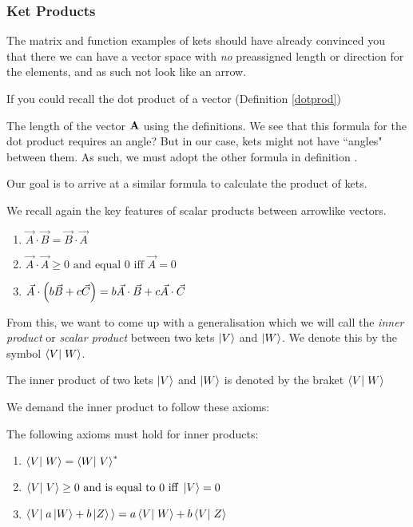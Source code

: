 \subsubsection{Ket Products}
The matrix and function examples of kets should have already convinced you that there we can have a vector space with \emph{no} preassigned length or direction for the elements, and as such not look like an arrow.

If you could recall the dot product of a vector (Definition \ref{dotprod})


The length of the vector $\mathbf{A}$ using the definitions. We see that this formula for the dot product requires an angle? But in our case, kets might not have ``angles" between them. As such, we must adopt the other formula in definition .


Our goal is to arrive at a similar formula to calculate the product of kets.

We recall again the key features of scalar products between arrowlike vectors.
\begin{enumerate}
\item $\vec{A} \cdot \vec{B} = \vec{B} \cdot \vec{A}$
\item $\vec{A} \cdot \vec{A} \geq 0 \text{ and equal } 0 \text{ iff } \vec{A} = 0$
\item $\vec{A} \cdot\left(b\vec{B} + c\vec{C} \right) = b\vec{A}\cdot\vec{B} + c\vec{A}\cdot\vec{C}$
\end{enumerate}

From this, we want to come up with a generalisation which we will call the \emph{inner product} or \emph{scalar product} between two kets $\left| V \right>$ and $\left| W \right>$. We denote this by the symbol $\braket{V}{W}$.

\begin{defi}
The inner product of two kets $\left| V \right>$ and $\left| W \right>$ is denoted by the braket $\braket{V}{W}$
\end{defi}

We demand the inner product to follow these axioms:
\begin{form}
The following axioms must hold for inner products:
\begin{enumerate}
\item $\braket{V}{W} = \braket{W}{V}^*$
\item $\braket{V}{V}\geq 0 \text{ and is equal to } 0 \text{ iff } \ket{V} 
= 0$
\item $\braket{V}{a\ket{W} + b\ket{Z}}  = a\braket{V}{W} + b\braket{V}{Z}$
\end{enumerate}
\end{form}

